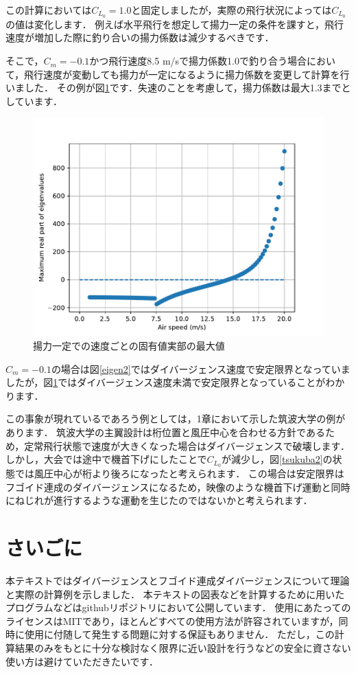 \documentclass{jarticle}
\begin{document}
この計算においては$C_{L_0}=1.0$と固定しましたが，実際の飛行状況によっては$C_{L_0}$の値は変化します．
例えば水平飛行を想定して揚力一定の条件を課すと，飛行速度が増加した際に釣り合いの揚力係数は減少するべきです．

そこで，$C_m=-0.1$かつ飛行速度8.5 m/sで揚力係数1.0で釣り合う場合において，飛行速度が変動しても揚力が一定になるように揚力係数を変更して計算を行いました．
その例が図\ref{eigen3}です．失速のことを考慮して，揚力係数は最大1.3までとしています．
\begin{figure}[H]
    \centering
    \includegraphics[width=0.7\linewidth]{image/Eigenvalues_of_phugoid-divergence-modal-varCL-0.1.pdf}
    \caption{揚力一定での速度ごとの固有値実部の最大値}
    \label{eigen3}
\end{figure}
$C_m=-0.1$の場合は図\ref{eigen2}ではダイバージェンス速度で安定限界となっていましたが，図\ref{eigen3}ではダイバージェンス速度未満で安定限界となっていることがわかります．

この事象が現れているであろう例としては，1章において示した筑波大学の例があります．
筑波大学の主翼設計は桁位置と風圧中心を合わせる方針であるため，定常飛行状態で速度が大きくなった場合はダイバージェンスで破壊します．
しかし，大会では途中で機首下げにしたことで$C_{L_0}$が減少し，図\ref{tsukuba2}の状態では風圧中心が桁より後ろになったと考えられます．
この場合は安定限界はフゴイド連成のダイバージェンスになるため，映像のような機首下げ運動と同時にねじれが進行するような運動を生じたのではないかと考えられます．

\section{さいごに}

本テキストではダイバージェンスとフゴイド連成ダイバージェンスについて理論と実際の計算例を示しました．
本テキストの図表などを計算するために用いたプログラムなどはgithubリポジトリ\cite{git}において公開しています．
使用にあたってのライセンスはMITであり，ほとんどすべての使用方法が許容されていますが，同時に使用に付随して発生する問題に対する保証もありません．
ただし，この計算結果のみをもとに十分な検討なく限界に近い設計を行うなどの安全に資さない使い方は避けていただきたいです．
\end{document}
